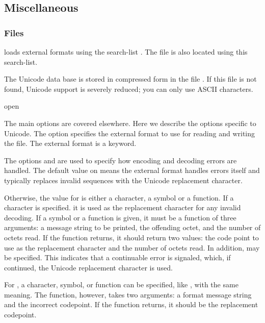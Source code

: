 \subsection{Miscellaneous}


\subsubsection{Files}

\cmucl{} loads external formats using the search-list
.  The  file is also located using
this search-list.

The Unicode data base is stored in compressed form in the file
.  If this file is not found, Unicode
support is severely reduced; you can only use ASCII characters.

\begin{defun}{}{open}{\args {} \amprest {}
    }

    The main options are covered elsewhere.  Here we describe the
    options specific to Unicode.  The option 
    specifies the external format to use for reading and writing the
    file.  The external format is a keyword.

    The options  and  are used
    to specify how encoding and decoding errors are handled.  The
    default value on \nil means the external format handles errors
    itself and typically replaces invalid sequences with the Unicode
    replacement character.

    Otherwise, the value for  is either a
    character, a symbol or a function.  If a character is
    specified. it is used as the replacement character for any invalid
    decoding.  If a symbol or a function is given, it must be a
    function of three arguments: a message string to be printed, the
    offending octet, and the number of octets read.  If the function
    returns, it should return two values: the code point to use as the
    replacement character and the number of octets read.  In addition,
    \true{} may be specified.  This indicates that a continuable error
    is signaled, which, if continued, the Unicode replacement
    character is used.

    For , a character, symbol, or function can be
    specified, like , with the same meaning.  The
    function, however, takes two arguments:  a format message string
    and the incorrect codepoint.  If the function returns, it should
    be the replacement codepoint.
\end{defun}    
      
